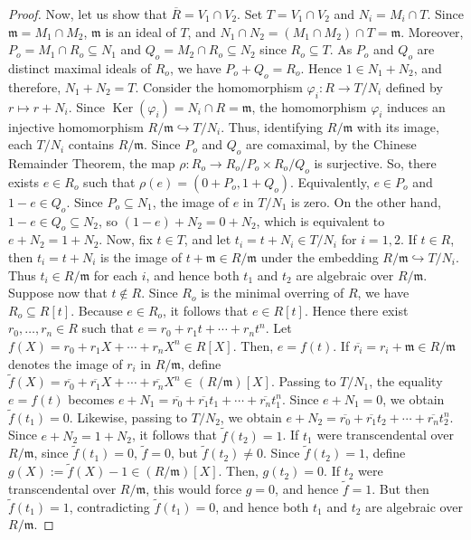 \documentclass[12pt]{article}
\renewcommand{\ker}{\operatorname{Ker}}
\begin{document}
\begin{proof}
		\smallskip Now, let us show that $\overline R=V_1\cap V_2$. Set $T=V_1\cap V_2$ and $N_i=M_i\cap T$. Since $\mathfrak{m}=M_1\cap M_2$, $\mathfrak{m}$ is an ideal of $T$, and $N_1\cap N_2=(M_1\cap M_2)\cap T=\mathfrak{m}$. Moreover, $P_o=M_1\cap R_o\subseteq N_1$ and $Q_o=M_2\cap R_o\subseteq N_2$ since $R_o\subseteq T$. As $P_o$ and $Q_o$ are distinct maximal ideals of $R_o$, we have $P_o+Q_o=R_o$. Hence $1\in N_1+N_2$, and therefore, $N_1+N_2=T$. Consider the homomorphism $\varphi_i:R\longrightarrow T/N_i$ defined by $r\longmapsto r+N_i$. Since $\ker(\varphi_i)=N_i\cap R=\mathfrak{m}$, the homomorphism $\varphi_i$ induces an injective homomorphism $R/\mathfrak{m}\hookrightarrow T/N_i$. Thus, identifying $R/\mathfrak{m}$ with its image, each $T/N_i$ contains $R/\mathfrak{m}$. Since $P_o$ and $Q_o$ are comaximal, by the Chinese Remainder Theorem, the map $\rho:R_o\longrightarrow R_o/P_o\times R_o/Q_o$ is surjective. So, there exists $e\in R_o$ such that $\rho(e)=(0+P_o, 1+Q_o)$. Equivalently, $e\in P_o$ and $1-e\in Q_o$. Since $P_o\subseteq N_1$, the image of $e$ in $T/N_1$ is zero. On the other hand, $1-e\in Q_o\subseteq N_2$, so $(1-e)+N_2=0+N_2$, which is equivalent to $e+N_2=1+N_2$. Now, fix $t\in T$, and let $t_i=t+N_i\in T/N_i$ for $i=1,2$. If $t\in R$, then $t_i=t+N_i$ is the image of $t+\mathfrak{m}\in R/\mathfrak{m}$ under the embedding $R/\mathfrak{m}\hookrightarrow T/N_i$. Thus $t_i\in R/\mathfrak{m}$ for each $i$, and hence both $t_1$ and $t_2$ are algebraic over $R/\mathfrak{m}$. Suppose now that $t\notin R$. Since $R_o$ is the minimal overring of $R$, we have $R_o\subseteq R[t]$. Because $e\in R_o$, it follows that $e\in R[t]$. Hence there exist $r_0,\ldots,r_n\in R$ such that $e=r_0+r_1t+\cdots+r_nt^n$. Let $f(X)=r_0+r_1X+\cdots+r_nX^n\in R[X]$. Then, $e=f(t)$. If $\overline{r_i}=r_i+\mathfrak{m}\in R/\mathfrak{m}$ denotes the image of $r_i$ in $R/\mathfrak{m}$, define $\widetilde f(X)=\overline{r_0}+\overline{r_1}X+\cdots+\overline{r_n}X^n\in (R/\mathfrak{m})[X]$. Passing to $T/N_1$, the equality $e=f(t)$ becomes $e+N_1=\overline{r_0}+\overline{r_1}t_1+\cdots+\overline{r_n}t_1^n$. Since $e+N_1=0$, we obtain $\widetilde f(t_1)=0$. Likewise, passing to $T/N_2$, we obtain $e+N_2=\overline{r_0}+\overline{r_1}t_2+\cdots+\overline{r_n}t_2^n$. Since $e+N_2=1+N_2$, it follows that $\widetilde f(t_2)=1$. If $t_1$ were transcendental over $R/\mathfrak{m}$, since $\widetilde f(t_1)=0$, $\widetilde f=0$, but $\widetilde f(t_2)\neq 0$. Since $\widetilde f(t_2)=1$, define $g(X):=\widetilde f(X)-1\in (R/\mathfrak{m})[X]$. Then, $g(t_2)=0$. If $t_2$ were transcendental over $R/\mathfrak{m}$, this would force $g=0$, and hence $\widetilde f=1$. But then $\widetilde f(t_1)=1$, contradicting $\widetilde f(t_1)=0$, and hence both $t_1$ and $t_2$ are algebraic over $R/\mathfrak{m}$.		
		

\end{proof}
\end{document}
